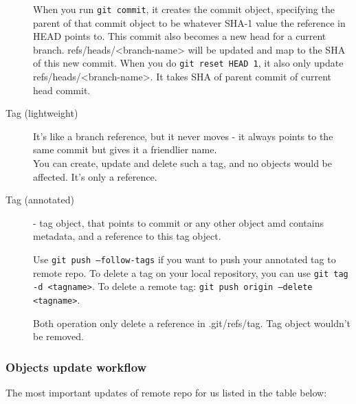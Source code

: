 \documentclass[12pt,oneside]{article}
\newcommand{\code}[1]{\texttt{#1}}
\begin{document}
\begin{description}
  When you run \code{git commit}, it creates the commit object,
  specifying the parent of that commit object to be whatever SHA-1 value
  the reference in HEAD points to.
  This commit also becomes a new head for a current branch.
  refs/heads/<branch-name> will be updated and map to the SHA
  of this new commit.
  When you do \code{git reset HEAD~1},
  it also only update refs/heads/<branch-name>.
  It takes SHA of parent commit of current head commit.
  \item[Tag (lightweight)] It's like a branch reference, but it never moves - it always points to the same commit but gives it a friendlier name.\\
  You can create, update and delete such a tag, and no objects would be affected.
  It's only a reference.
  \item[Tag (annotated)] - tag object, that points to commit or any other object amd contains metadata, and a reference to this tag object.

  Use \code{git push --follow-tags} if you want to push your annotated tag to remote repo.
  To delete a tag on your local repository, you can use \code{git tag -d <tagname>}.
  To delete a remote tag: \code{git push origin --delete <tagname>}.

  Both operation only delete a reference in .git/refs/tag.
  Tag object wouldn't be removed.
\end{description}

\subsubsection{Objects update workflow}
The most important updates of remote repo for us listed in the table below:
\end{document}
